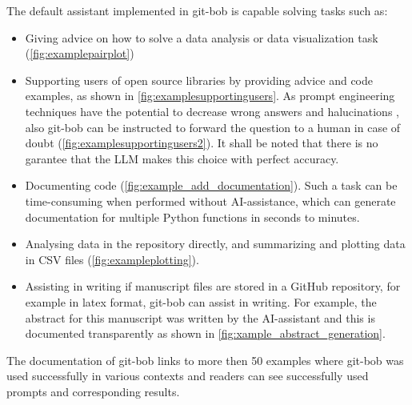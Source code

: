 \documentclass[sn-mathphys-num]{sn-jnl}%
\theoremstyle{thmstyleone}%
\theoremstyle{thmstyletwo}%
\theoremstyle{thmstylethree}%
\begin{document}
The default assistant implemented in git-bob is capable solving tasks such as: \begin{itemize}
  \item Giving advice on how to solve a data analysis or data visualization task (\ref{fig:examplepairplot})
  \item Supporting users of open source libraries by providing advice and code examples, as shown in \ref{fig:examplesupportingusers}. As prompt engineering techniques have the potential to decrease wrong answers and halucinations \cite{yin2023largelanguagemodelsknow}, also git-bob can be instructed to forward the question to a human in case of doubt (\ref{fig:examplesupportingusers2}). It shall be noted that there is no garantee that the LLM makes this choice with perfect accuracy. 
  \item Documenting code (\ref{fig:example_add_documentation}). Such a task can be time-consuming when performed without AI-assistance, which can generate documentation for multiple Python functions in seconds to minutes. 
  \item Analysing data in the repository directly, and summarizing and plotting data in CSV files (\ref{fig:exampleplotting}). 
  \item Assisting in writing if manuscript files are stored in a GitHub repository, for example in latex format, git-bob can assist in writing. For example, the abstract for this manuscript was written by the AI-assistant and this is documented transparently as shown in \ref{fig:xample_abstract_generation}.
  \end{itemize}
The documentation of git-bob links to more then 50 examples where git-bob was used successfully in various contexts and readers can see successfully used prompts and corresponding results.
\end{document}
